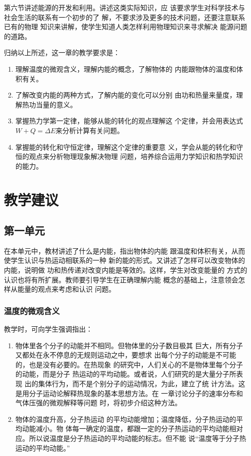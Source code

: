 第六节讲述能源的开发和利用。讲述这类实际知识，应
该要求学生对科学技术与社会生活的联系有一个初步的了
解，不要求涉及更多的技术问题，还要注意联系已有的物理
知识来讲解，使学生知道人类怎样利用物理知识来寻求解决
能源问题的道路。

归纳以上所述，这一章的教学要求是：
\begin{enumerate}
\item 理解温度的微观含义，理解内能的概念，了解物体的
内能跟物体的温度和体积有关。
\item 了解改变内能的两种方式，了解内能的变化可以分别
由功和热量来量度，理解热功当量的意义。
\item 掌握热力学第一定律，能够从能的转化的观点理解这
个定律，并会用表达式$W+Q=\Delta E$来分析计算有关问题。
\item 掌握能的转化和守恒定律，理解这个定律的重要意
义，学会从能的转化和守恒的观点来分析物理现象解决物理
问题，培养综合运用力学知识和热学知识的能力。
\end{enumerate}

\section{教学建议}
\subsection{第一单元}
在本单元中，教材讲述了什么是内能，指出物体的内能
跟温度和体积有关，从而使学生认识与热运动相联系的一种
新的能的形式。又讲述了怎样可以改变物体的内能，说明做
功和热传递对改变内能是等效的。这样，学生对改变能量的
方式的认识也将有所扩展。教师要引导学生在正确理解内能
概念的基础上，注意领会怎样从能量的观点来考虑和认识
问题。

\subsubsection{温度的微观含义} 教学时，可向学生强调指出：
\begin{enumerate}
\item 
物体里各个分子的动能并不相同。但物体里的分子数目极其
巨大，所有分子又都处在永不停息的无规则运动之中，要想求
出每个分子的动能是不可能的，也是没有必要的。在热现象
的研究中，人们关心的不是物体里每个分子的动能，而是分子
热运动的平均动能。或者说，人们研究的是大量分子所表现
出的集体行为，而不是个别分子的运动情况，为此，建立了统
计方法。这是用分子运动论解释热现象的基本思想方法。在
一章讨论分子的速率分布和气体压强的微观解释等问题
时，将初步介绍这种方法。    \item 物体的温度升高，分子热运动
的平均动能增加；温度降低，分子热运动的平均动能减小。物
体每一确定的温度，都跟一定的分子热运动的平均动能相对
应。所以说温度是分子热运动的平均动能的标志。但不能
说“温度等于分子热运动的平均动能。”
\end{enumerate}


